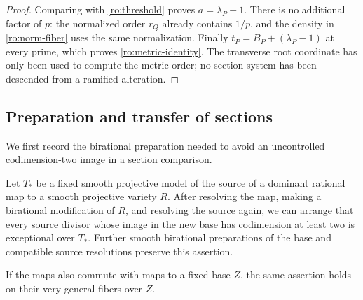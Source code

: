 \begin{proof}
Comparing with \eqref{ro:threshold} proves $a=\lambda_P-1$.
There is no additional factor of $p$: the normalized order $r_Q$ already
contains $1/p$, and the density in \eqref{ro:norm-fiber} uses the same
normalization.  Finally
$t_P=B_P+(\lambda_P-1)$ at every prime, which proves
\eqref{ro:metric-identity}.  The transverse root coordinate has only
been used to compute the metric order; no section system has been
descended from a ramified alteration.
\end{proof}

\subsection{Preparation and transfer of sections}

We first record the birational preparation needed to avoid an
uncontrolled codimension-two image in a section comparison.

\begin{lemma}
\label{ro:extraction}
Let $T_*$ be a fixed smooth projective model of the source of a dominant
rational map to a smooth projective variety $R$.  After resolving the
map, making a birational modification of $R$, and resolving the source
again, we can arrange that every source divisor whose image in the new
base has codimension at least two is exceptional over $T_*$.  Further
smooth birational preparations of the base and compatible source
resolutions preserve this assertion.

If the maps also commute with maps to a fixed base $Z$, the same
assertion holds on their very general fibers over $Z$.
\end{lemma}

